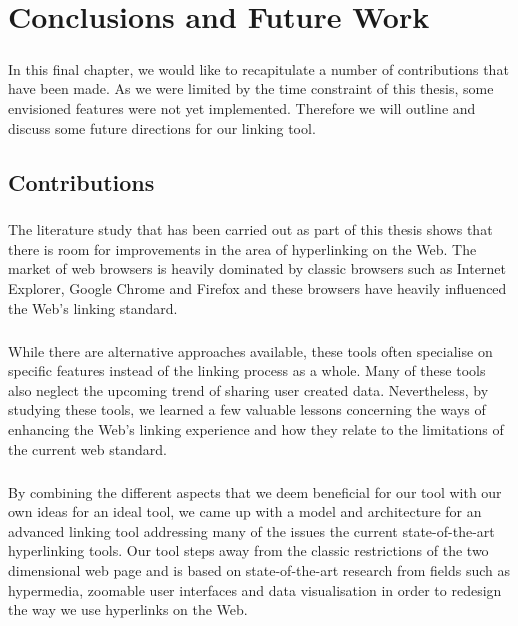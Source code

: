 
\chapter{Conclusions and Future Work} \label{cha:Conclusions and Future Work}
\paragraph{}
In this final chapter, we would like to recapitulate a number of contributions that have been made. As we were limited by the time constraint of this thesis, some  envisioned features were not yet implemented. Therefore we will outline and discuss some future directions for our linking tool.

\section{Contributions} \label{sec:Contributions}
\paragraph{}
The literature study that has been carried out as part of this thesis shows that there is room for improvements in the area of hyperlinking on the Web. The market of web browsers is heavily dominated by classic browsers such as Internet Explorer, Google Chrome and Firefox and these browsers have heavily influenced the Web's linking standard.
\paragraph{}
While there are alternative approaches available, these tools often specialise on specific features instead of the linking process as a whole. Many of these tools also neglect the upcoming trend of sharing user created data. Nevertheless, by studying these tools, we learned a few valuable lessons concerning the ways of enhancing the Web's linking experience and how they relate to the limitations of the current web standard.
\paragraph{}
By combining the different aspects that we deem beneficial for our tool with our own ideas for an ideal tool, we came up with a model and architecture for an advanced linking tool addressing many of the issues the current state-of-the-art hyperlinking tools. Our tool steps away from the classic restrictions of the two dimensional web page and is based on state-of-the-art research from fields such as hypermedia, zoomable user interfaces and data visualisation in order to redesign the way we use hyperlinks on the Web.
